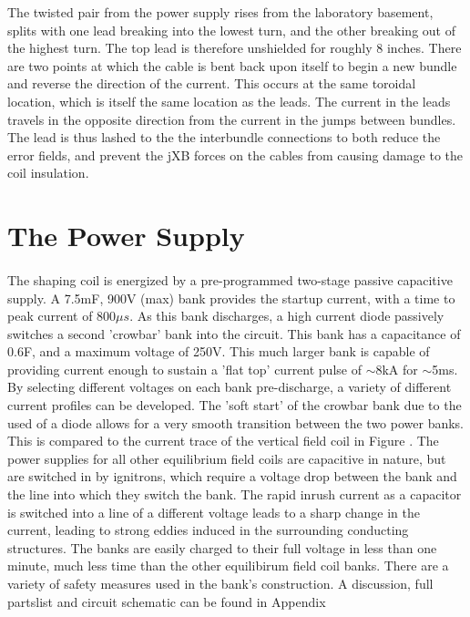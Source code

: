 The twisted pair from the power supply rises from the laboratory basement, splits with one lead breaking into the lowest turn, and the other breaking out of the highest turn.  The top lead is therefore unshielded for roughly 8 inches.  There are two points at which the cable is bent back upon itself to begin a new bundle and reverse the direction of the current.  This occurs at the same toroidal location, which is itself the same location as the leads.  The current in the leads travels in the opposite direction from the current in the jumps between bundles.  The lead is thus lashed to the the interbundle connections to both reduce the error fields, and prevent the jXB forces on the cables from causing damage to the coil insulation.
\section{The Power Supply}
\paragraph{}The shaping coil is energized by a pre-programmed two-stage passive capacitive supply.  A 7.5mF, 900V (max) bank provides the startup current, with a time to peak current of $800\mu s$.  As this bank discharges, a high current diode passively switches a second 'crowbar' bank into the circuit.  This bank has a capacitance of 0.6F, and a maximum voltage of 250V.  This much larger bank is capable of providing current enough to sustain a 'flat top' current pulse of $\sim$8kA for $\sim$5ms.  By selecting different voltages on each bank pre-discharge, a variety of different current profiles can be developed.  The 'soft start' of the crowbar bank due to the used of a diode allows for a very smooth transition between the two power banks.  This is compared to the current trace of the vertical field coil in Figure .  The power supplies for all other equilibrium field coils are capacitive in nature, but are switched in by ignitrons, which require a voltage drop between the bank and the line into which they switch the bank.  The rapid inrush current as a capacitor is switched into a line of a different voltage leads to a sharp change in the current, leading to strong eddies induced in the surrounding conducting structures.  The banks are easily charged to their full voltage in less than one minute, much less time than the other equilibirum field coil banks.  There are a variety of safety measures used in the bank's construction.  A discussion, full partslist and circuit schematic can be found in Appendix 
